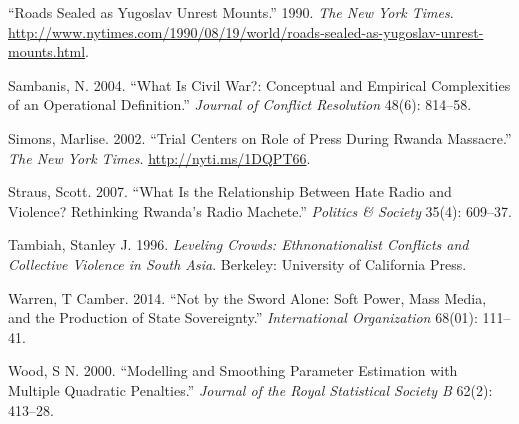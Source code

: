 \documentclass[12pt,article,oneside]{memoir}
\begin{document}
``Roads Sealed as Yugoslav Unrest Mounts.'' 1990. \emph{The New York
Times}.
\url{http://www.nytimes.com/1990/08/19/world/roads-sealed-as-yugoslav-unrest-mounts.html}.

Sambanis, N. 2004. ``What Is Civil War?: Conceptual and Empirical
Complexities of an Operational Definition.'' \emph{Journal of Conflict
Resolution} 48(6): 814--58.

Simons, Marlise. 2002. ``Trial Centers on Role of Press During Rwanda
Massacre.'' \emph{The New York Times}. \url{http://nyti.ms/1DQPT66}.

Straus, Scott. 2007. ``What Is the Relationship Between Hate Radio and
Violence? Rethinking Rwanda's Radio Machete.'' \emph{Politics \&
Society} 35(4): 609--37.

Tambiah, Stanley J. 1996. \emph{Leveling Crowds: Ethnonationalist
Conflicts and Collective Violence in South Asia}. Berkeley: University
of California Press.

Warren, T Camber. 2014. ``Not by the Sword Alone: Soft Power, Mass
Media, and the Production of State Sovereignty.'' \emph{International
Organization} 68(01): 111--41.

Wood, S N. 2000. ``Modelling and Smoothing Parameter Estimation with
Multiple Quadratic Penalties.'' \emph{Journal of the Royal Statistical
Society B} 62(2): 413--28.
\end{document}
